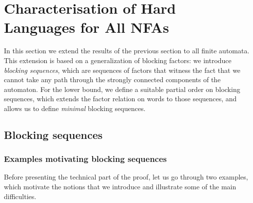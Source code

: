 \documentclass[letterpaper, USenglish, cleveref, autoref, thm-restate, numberwithinsect]{lipics-v2021}
\theoremstyle{theorem}
\theoremstyle{definition}
\begin{document}
\section{Characterisation of Hard Languages for All NFAs}
\label{sec:general}
In this section we extend the results of the previous section to all finite automata.
This extension is based on a generalization of blocking factors: we introduce \emph{blocking sequences}, which are sequences of factors that witness the fact that we cannot take any path through the strongly connected components of the automaton.
For the lower bound, we define a suitable partial order on blocking sequences, which extends the factor relation on words to those sequences, and allows us to define \emph{minimal} blocking sequences.

\subsection{Blocking sequences}\label{sec:blocking-seq}

\subsubsection{Examples motivating blocking sequences}

Before presenting the technical part of the proof, let us go through two examples, which motivate the notions that we introduce and illustrate some of the main difficulties.
\end{document}
